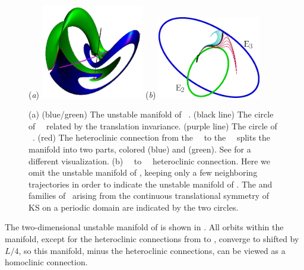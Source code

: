 \begin{figure}[t]
\begin{center}
(\textit{a}) \includegraphics[width=0.4\textwidth, clip=true]{figs_bmp/ks22manifold1.eps}
(\textit{b}) \includegraphics[width=0.4\textwidth, clip=true]{figs_bmp/ks22E2-E3hetero.eps}
\end{center}
\caption{
(a) (blue/green) The unstable manifold of ~\eqv.
    (black line) The circle of ~\eqva\
related by the translation invariance.
(purple line) The circle  of ~\eqva.
(red) The heteroclinic connection
from the ~\eqv\ to the ~\eqv\ splits
the manifold into two parts,
colored (blue) and (green).  See
 for a different visualization.
(b) ~\eqv\ to ~\eqv\ heteroclinic
connection. Here we omit the unstable manifold of ,
keeping only a few neighboring trajectories in order to indicate
the unstable manifold of . The \EQV{2} and \EQV{3}
families of \eqva\ arising from the continuous translational
symmetry of KS on a periodic domain are indicated by the two circles.
        }
\label{f:KS22Manifold}
\end{figure}

The two-dimensional unstable manifold of  is shown in
.  All orbits within the manifold, except
for the heteroclinic connections from  to , converge
to \EQV{2} shifted by $L/4$,
so this manifold, minus the heteroclinic connections, can be viewed as
a homoclinic connection.  %

